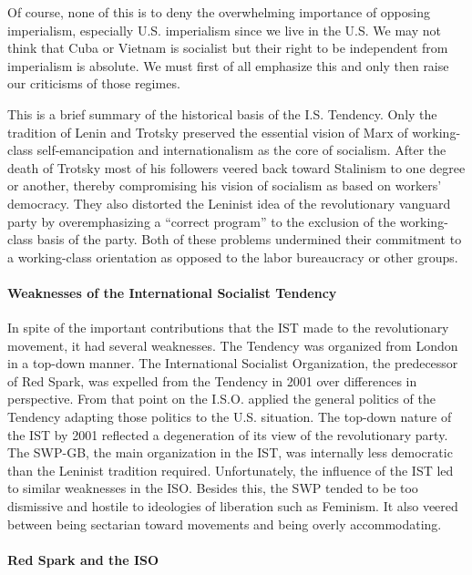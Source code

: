 Of course, none of this is to deny the overwhelming importance of opposing imperialism, especially U.S. imperialism since we live in the U.S. We may not think that Cuba or Vietnam is socialist but their right to be independent from imperialism is absolute. We must first of all emphasize this and only then raise our criticisms of those regimes.

This is a brief summary of the historical basis of the I.S. Tendency. Only the tradition of Lenin and Trotsky preserved the essential vision of Marx of working-class self-emancipation and internationalism as the core of socialism. After the death of Trotsky most of his followers veered back toward Stalinism to one degree or another, thereby compromising his vision of socialism as based on workers' democracy. They also distorted the Leninist idea of the revolutionary vanguard party by overemphasizing a ``correct program'' to the exclusion of the working-class basis of the party. Both of these problems undermined their commitment to a working-class orientation as opposed to the labor bureaucracy or other groups.

\paragraph{Weaknesses of the International Socialist Tendency}

In spite of the important contributions that the IST made to the revolutionary movement, it had several weaknesses. The Tendency was organized from London in a top-down manner. The International Socialist Organization, the predecessor of Red Spark, was expelled from the Tendency in 2001 over differences in perspective. From that point on the I.S.O. applied the general politics of the Tendency adapting those politics to the U.S. situation. The top-down nature of the IST by 2001 reflected a degeneration of its view of the revolutionary party. The SWP-GB, the main organization in the IST, was internally less democratic than the Leninist tradition required. Unfortunately, the influence of the IST led to similar weaknesses in the ISO. Besides this, the SWP tended to be too dismissive and hostile to ideologies of liberation such as Feminism. It also veered between being sectarian toward movements and being overly accommodating.

\paragraph{Red Spark and the ISO}

